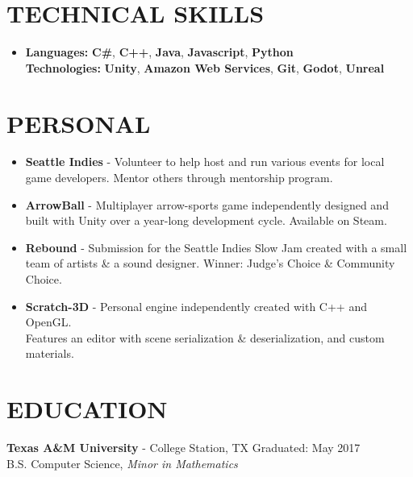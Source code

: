 \documentclass[resmargin,10pt]{res} %
\begin{document}
\begin{resume}
\section{TECHNICAL SKILLS}	
							\begin{itemize}
                    		\item[] 
\textbf{\large Languages:} \textbf{C\#}, \textbf{C++}, \textbf{Java}, \textbf{Javascript}, \textbf{Python}\\
\textbf{\large Technologies:} \textbf{Unity}, \textbf{Amazon Web Services}, \textbf{Git}, \textbf{Godot}, \textbf{Unreal}
                    		\end{itemize} 
\section{PERSONAL}
				\begin{itemize}
				\item \textbf{Seattle Indies} - Volunteer to help host and run various events for local game developers. Mentor others through mentorship program.
								\item \textbf{ArrowBall} - Multiplayer arrow-sports game independently designed and built with Unity over a year-long development cycle. Available on Steam.
								\item \textbf{Rebound} - Submission for the Seattle Indies Slow Jam created with a small team of artists \& a sound designer. Winner: Judge's Choice \& Community Choice.   
				                	\item \textbf{Scratch-3D} - Personal engine independently created with C++ and OpenGL. \\Features an editor with scene serialization \& deserialization, and custom materials.
                \end{itemize}
                
\section{EDUCATION}
{\bf Texas A\&M University} - College Station, TX \hfill
Graduated: May 2017 \\
B.S. Computer Science,
\textit{Minor in Mathematics}
\end{resume} 
\end{document}
